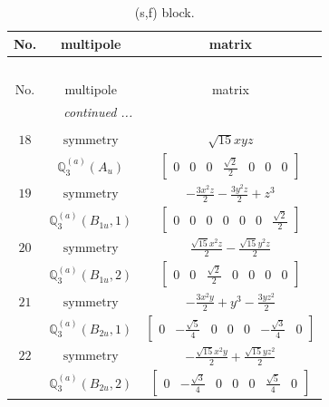 \documentclass[fleqn,8pt,landscape]{jsarticle}
\begin{document}
\begin{longtable}{ccc}
\caption{(s,f) block.}
 \\
 \hline \hline
No. & multipole & matrix \\ \hline \endfirsthead

\multicolumn{2}{l}{\tablename\ \thetable{}} \\
 \hline \hline
No. & multipole & matrix \\ \hline \endhead

 \hline \hline
\multicolumn{2}{r}{\footnotesize\it continued ...} \\ \endfoot

 \hline \hline
\multicolumn{2}{r}{} \\ \endlastfoot

$ 18 $ & $ \text{symmetry} $ & $ \sqrt{15} x y z $ \\
$  $ & $ \mathbb{Q}_{3}^{(a)}(A_{u}) $ & $ \begin{bmatrix} 0 & 0 & 0 & \frac{\sqrt{2}}{2} & 0 & 0 & 0 \end{bmatrix} $ \\ \hline
$ 19 $ & $ \text{symmetry} $ & $ - \frac{3 x^{2} z}{2} - \frac{3 y^{2} z}{2} + z^{3} $ \\
$  $ & $ \mathbb{Q}_{3}^{(a)}(B_{1u},1) $ & $ \begin{bmatrix} 0 & 0 & 0 & 0 & 0 & 0 & \frac{\sqrt{2}}{2} \end{bmatrix} $ \\ \hline
$ 20 $ & $ \text{symmetry} $ & $ \frac{\sqrt{15} x^{2} z}{2} - \frac{\sqrt{15} y^{2} z}{2} $ \\
$  $ & $ \mathbb{Q}_{3}^{(a)}(B_{1u},2) $ & $ \begin{bmatrix} 0 & 0 & \frac{\sqrt{2}}{2} & 0 & 0 & 0 & 0 \end{bmatrix} $ \\ \hline
$ 21 $ & $ \text{symmetry} $ & $ - \frac{3 x^{2} y}{2} + y^{3} - \frac{3 y z^{2}}{2} $ \\
$  $ & $ \mathbb{Q}_{3}^{(a)}(B_{2u},1) $ & $ \begin{bmatrix} 0 & - \frac{\sqrt{5}}{4} & 0 & 0 & 0 & - \frac{\sqrt{3}}{4} & 0 \end{bmatrix} $ \\ \hline
$ 22 $ & $ \text{symmetry} $ & $ - \frac{\sqrt{15} x^{2} y}{2} + \frac{\sqrt{15} y z^{2}}{2} $ \\
$  $ & $ \mathbb{Q}_{3}^{(a)}(B_{2u},2) $ & $ \begin{bmatrix} 0 & - \frac{\sqrt{3}}{4} & 0 & 0 & 0 & \frac{\sqrt{5}}{4} & 0 \end{bmatrix} $ \\ \hline

\end{longtable}
\end{document}
